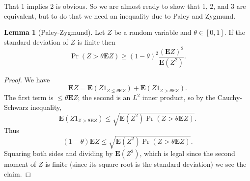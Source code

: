 \documentclass[12pt]{report}
\newcommand{\Expect}{\mathbf E}
\theoremstyle{definition}
\newtheorem{lemma}[theorem]{Lemma}
\begin{document}
That 1 implies 2 is obvious. So we are almost ready to show that 1, 2, and 3 are equivalent, but to do that we need an inequality due to Paley and Zygmund.
\begin{lemma}[Paley-Zygmund]
Let $Z$ be a random variable and $\theta \in [0, 1]$. If the standard deviation of $Z$ is finite then
$$\Pr(Z > \theta \Expect Z) \geq (1 - \theta)^2 \frac{(\Expect Z)^2}{\Expect(Z^2)}.$$
\end{lemma}
\begin{proof}
We have
$$\Expect Z = \Expect(Z1_{Z \leq \theta \Expect Z}) + \Expect(Z1_{Z > \theta \Expect Z}).$$
The first term is $\leq \theta \Expect Z$; the second is an $L^2$ inner product, so by the Cauchy-Schwarz inequality,
$$\Expect(Z 1_{Z > \theta \Expect Z}) \leq \sqrt{\Expect(Z^2) \Pr(Z > \theta \Expect Z)}.$$
Thus
$$(1 - \theta) \Expect Z \leq \sqrt{\Expect(Z^2) \Pr(Z > \theta \Expect Z)}.$$
Squaring both sides and dividing by $\Expect(Z^2)$, which is legal since the second moment of $Z$ is finite (since its square root is the standard deviation) we see the claim.
\end{proof}
\end{document}
